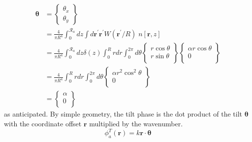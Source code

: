 \begin{equation}
\begin{aligned}
\boldsymbol{\theta} & = 
\left\{
\begin{array}{c}
\theta_{x} \\
\theta_{y} 
\end{array} 
\right\}\\
& = 
\frac{4}{\pi R^{4}} \int_{0}^{\mathcal{R}_{a}} dz 
\int d\boldsymbol{r}^{\prime} \boldsymbol{r}^{\prime} W(\boldsymbol{r}^{\prime}/R) \; n\left[\boldsymbol{r},z\right] \\
& = 
\frac{4}{\pi R^{4}} \int_{0}^{\mathcal{R}_{a}} dz \delta\left(z\right)
\int_{0}^{R} r dr \int_{0}^{2\pi} d\theta 
\left\{
\begin{array}{c}
r \cos \theta \\
r \sin \theta \\ 
\end{array}
\right\}
\left\{
\begin{array}{c}
\alpha r \cos \theta \\
0 \\ 
\end{array}
\right\} \\
& = 
\frac{4}{\pi R^{4}}  
\int_{0}^{R} r dr \int_{0}^{2\pi} d\theta 
\left\{
\begin{array}{c}
\alpha r^{2} \cos^{2} \theta \\
0 \\ 
\end{array}
\right\}\\
& = 
\left\{
\begin{array}{c}
\alpha \\
0 \\ 
\end{array}
\right\}
\end{aligned}
\end{equation}
as anticipated.  By simple geometry, the tilt phase is the dot product
of the tilt $\boldsymbol{\theta}$ with the coordinate offset
$\boldsymbol{r}$ multiplied by the wavenumber.
\begin{equation}\label{tiltphase_n}
\phi^{T}_{a}\left(\boldsymbol{r}\right) = k \boldsymbol{r}  \cdot \boldsymbol{\theta} 
\end{equation}

